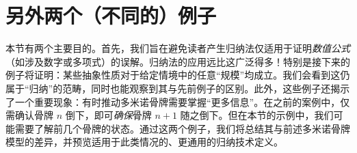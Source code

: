\section{另外两个（不同的）例子} \label{sec:section2.4}

本节有两个主要目的。首先，我们旨在避免读者产生归纳法仅适用于证明\emph{数值公式}（如涉及数字或多项式）的误解。归纳法的应用远比这广泛得多！特别是接下来的例子将证明：某些抽象性质对于给定情境中的任意``规模''均成立。我们会看到这仍属于``归纳''的范畴，同时也能观察到其与先前例子的区别。此外，这些例子还揭示了一个重要现象：有时推动多米诺骨牌需要掌握``更多信息''。在之前的案例中，仅需确认骨牌 $n$ 倒下，即可\emph{确保}骨牌 $n + 1$ 随之倒下。但在本节的示例中，我们可能需要了解前几个骨牌的状态。通过这两个例子，我们将总结其与前述多米诺骨牌模型的差异，并预览适用于此类情况的、更通用的归纳技术定义。





